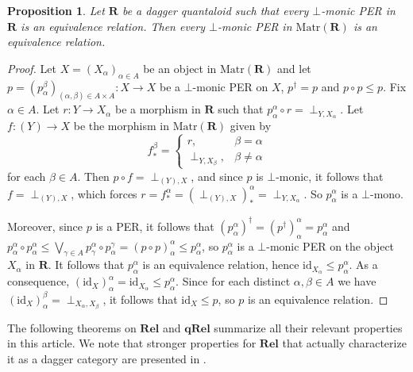 \documentclass[12pt]{tac}
\newtheorem{proposition}[theorem]{Proposition}
\theoremstyle{definition}
\theoremstyle{remark}
\newcommand{\<}{\langle}
\renewcommand{\>}{\rangle}
\renewcommand{\:}{\colon}
\newcommand{\id}{\mathrm{id}}
\begin{document}
\begin{proposition}\label{prop:PER-Matr}
    Let $\mathbf R$ be a dagger quantaloid such that every $\bot$-monic PER in $\mathbf R$ is an equivalence relation. Then every $\bot$-monic PER in $\mathrm{Matr}(\mathbf R)$ is an equivalence relation. 
\end{proposition}
\begin{proof}
    Let $X=(X_\alpha)_{\alpha\in A}$ be an object in $\mathrm{Matr}(\mathbf R)$ and let $p=(p_\alpha^\beta)_{(\alpha,\beta)\in A\times A}:X\to X$ be a $\bot$-monic PER on $X$, $p^\dag=p$ and $p\circ p\leq p$.
    Fix $\alpha\in A$. Let $r:Y\to X_\alpha$ be a morphism in $\mathbf R$ such that $p_\alpha^\alpha\circ r= \perp_{Y,X_\alpha}$. Let $f:(Y)\to X$ be the morphism in $\mathrm{Matr}(\mathbf R)$ given by \[f_*^\beta = \begin{cases} r, & \beta=\alpha
    \\
    \perp_{Y,X_\beta}, & \beta\neq\alpha
    \end{cases}\]
    for each $\beta\in A$.
    Then $p\circ f=\perp_{(Y),X}$, and since $p$ is $\bot$-monic, it follows that $f=\perp_{(Y),X}$, which forces $r=f_*^\alpha=(\perp_{(Y),X})_*^\alpha=\perp_{Y,X_\alpha}$. So $p_\alpha^\alpha$ is a $\bot$-mono.
    
Moreover, since $p$ is a PER, it follows that $(p_\alpha^\alpha)^\dag=(p^\dag)_\alpha^\alpha=p_\alpha^\alpha$ and $p_\alpha^\alpha\circ p_\alpha^\alpha\leq \bigvee_{\gamma\in A}p_\gamma^\alpha\circ p_\alpha^\gamma=(p\circ p)_\alpha^\alpha\leq p_\alpha^\alpha$, so $p_\alpha^\alpha$ is a $\bot$-monic PER on the object $X_\alpha$ in $\mathbf R$. It follows that $p_\alpha^\alpha$ is an equivalence relation, hence $\id_{X_\alpha}\leq p_\alpha^\alpha$. As a consequence, $(\id_X)_\alpha^\alpha=\id_{X_\alpha}\leq p_\alpha^\alpha$. Since for each distinct $\alpha,\beta\in A$ we have $(\id_X)_\alpha^\beta=\perp_{X_\alpha,X_\beta}$, it follows that $\id_X\leq p$, so $p$ is an equivalence relation.    
\end{proof}


The following theorems on $\mathbf{Rel}$ and $\mathbf{qRel}$ summarize all their relevant properties in this article. We note that stronger properties for $\mathbf{Rel}$ that actually characterize it as a dagger category are presented in \cite{Kornell23}.
\end{document}
